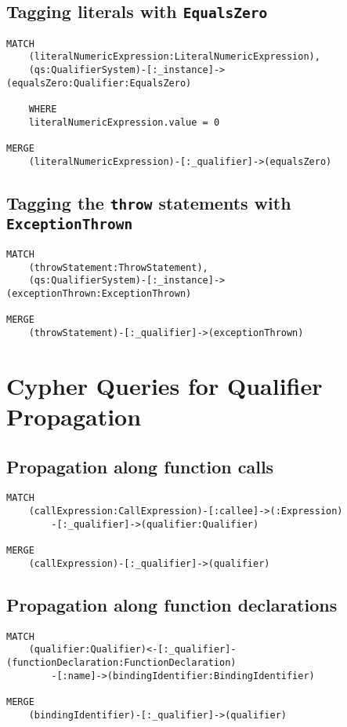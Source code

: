 \subsection[Tagging literals with EqualsZero]{Tagging literals with \lstinline{EqualsZero}}
\begin{lstlisting}[language=Cypher]
MATCH
    (literalNumericExpression:LiteralNumericExpression),
    (qs:QualifierSystem)-[:_instance]->(equalsZero:Qualifier:EqualsZero)

    WHERE
    literalNumericExpression.value = 0

MERGE
    (literalNumericExpression)-[:_qualifier]->(equalsZero)
\end{lstlisting}


\subsection[Tagging the throw statements with ExceptionThrown]{Tagging the \lstinline{throw} statements with \lstinline{ExceptionThrown}}
\begin{lstlisting}[language=Cypher]
MATCH
    (throwStatement:ThrowStatement),
    (qs:QualifierSystem)-[:_instance]->(exceptionThrown:ExceptionThrown)

MERGE
    (throwStatement)-[:_qualifier]->(exceptionThrown)
\end{lstlisting}


\newpage
\section{Cypher Queries for Qualifier Propagation}

\subsection{Propagation along function calls}
\begin{lstlisting}[language=Cypher]
MATCH
    (callExpression:CallExpression)-[:callee]->(:Expression)
        -[:_qualifier]->(qualifier:Qualifier)

MERGE
    (callExpression)-[:_qualifier]->(qualifier)
\end{lstlisting}


\subsection{Propagation along function declarations}
\begin{lstlisting}[language=Cypher]
MATCH
    (qualifier:Qualifier)<-[:_qualifier]-(functionDeclaration:FunctionDeclaration)
        -[:name]->(bindingIdentifier:BindingIdentifier)

MERGE
    (bindingIdentifier)-[:_qualifier]->(qualifier)
\end{lstlisting}



